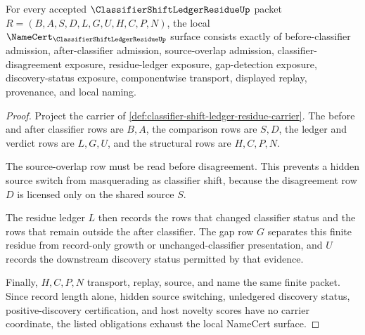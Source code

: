 \begin{theorem}
\label{thm:classifier-shift-ledger-residue-namecert-obligations}
For every accepted $\ClassifierShiftLedgerResidueUp$ packet $R=(B,A,S,D,L,G,U,H,C,P,N)$, the local $\NameCert_{\ClassifierShiftLedgerResidueUp}$ surface consists exactly of before-classifier admission, after-classifier admission, source-overlap admission, classifier-disagreement exposure, residue-ledger exposure, gap-detection exposure, discovery-status exposure, componentwise transport, displayed replay, provenance, and local naming.
\end{theorem}
\begin{proof}
Project the carrier of \autoref{def:classifier-shift-ledger-residue-carrier}. The before and after classifier rows are $B,A$, the comparison rows are $S,D$, the ledger and verdict rows are $L,G,U$, and the structural rows are $H,C,P,N$.

The source-overlap row must be read before disagreement. This prevents a hidden source switch from masquerading as classifier shift, because the disagreement row $D$ is licensed only on the shared source $S$.

The residue ledger $L$ then records the rows that changed classifier status and the rows that remain outside the after classifier. The gap row $G$ separates this finite residue from record-only growth or unchanged-classifier presentation, and $U$ records the downstream discovery status permitted by that evidence.

Finally, $H,C,P,N$ transport, replay, source, and name the same finite packet. Since record length alone, hidden source switching, unledgered discovery status, positive-discovery certification, and host novelty scores have no carrier coordinate, the listed obligations exhaust the local NameCert surface.
\end{proof}

